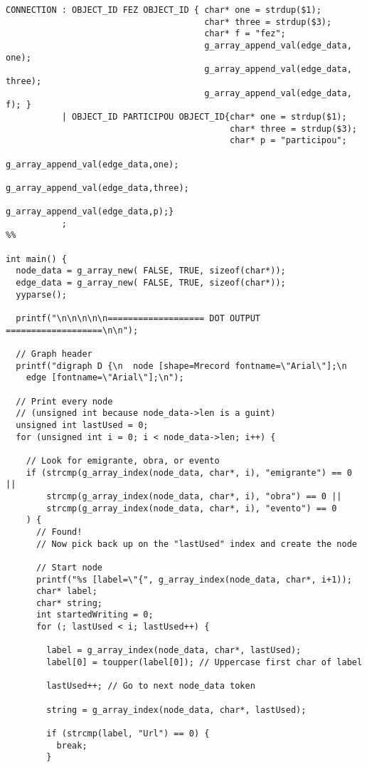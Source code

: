 \documentclass[a4paper]{article}
\begin{document}
\begin{lstlisting}
CONNECTION : OBJECT_ID FEZ OBJECT_ID { char* one = strdup($1); 
                                       char* three = strdup($3); 
                                       char* f = "fez"; 
                                       g_array_append_val(edge_data, one);
                                       g_array_append_val(edge_data, three);
                                       g_array_append_val(edge_data, f); }
           | OBJECT_ID PARTICIPOU OBJECT_ID{char* one = strdup($1); 
                                            char* three = strdup($3); 
                                            char* p = "participou";
                                          g_array_append_val(edge_data,one);
                                          g_array_append_val(edge_data,three);
                                          g_array_append_val(edge_data,p);}
           ;
%%

int main() {
  node_data = g_array_new( FALSE, TRUE, sizeof(char*));
  edge_data = g_array_new( FALSE, TRUE, sizeof(char*));
  yyparse();

  printf("\n\n\n\n\n=================== DOT OUTPUT ===================\n\n");

  // Graph header
  printf("digraph D {\n  node [shape=Mrecord fontname=\"Arial\"];\n  
    edge [fontname=\"Arial\"];\n");

  // Print every node
  // (unsigned int because node_data->len is a guint)
  unsigned int lastUsed = 0;
  for (unsigned int i = 0; i < node_data->len; i++) {

    // Look for emigrante, obra, or evento
    if (strcmp(g_array_index(node_data, char*, i), "emigrante") == 0 ||
        strcmp(g_array_index(node_data, char*, i), "obra") == 0 ||
        strcmp(g_array_index(node_data, char*, i), "evento") == 0
    ) {
      // Found!
      // Now pick back up on the "lastUsed" index and create the node

      // Start node
      printf("%s [label=\"{", g_array_index(node_data, char*, i+1));
      char* label;
      char* string;
      int startedWriting = 0;
      for (; lastUsed < i; lastUsed++) {

        label = g_array_index(node_data, char*, lastUsed);
        label[0] = toupper(label[0]); // Uppercase first char of label

        lastUsed++; // Go to next node_data token

        string = g_array_index(node_data, char*, lastUsed);

        if (strcmp(label, "Url") == 0) {
          break;
        }


\end{lstlisting}
\end{document}

